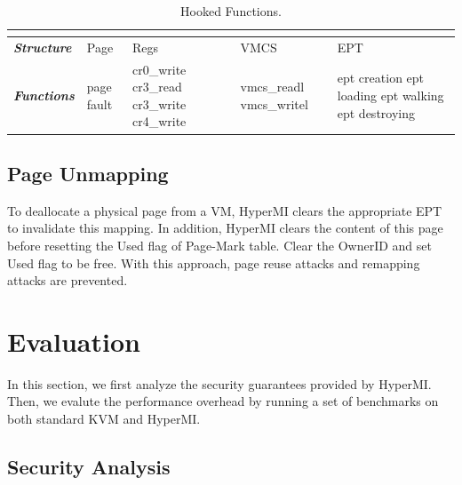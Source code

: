 \documentclass[conference]{IEEEtran}
\begin{document}
\begin{table}
\centering
\caption{Hooked Functions.}\label{tabhook}
\begin{tabular}{p{1cm}|p{1.2cm}|p{1.1cm}|p{1.4cm}|p{1.6cm}}
\hline
\multicolumn{5}{c}{\bfseries\textbf\centering{Hooked Functions}}\\
\hline
{\itshape\bfseries Structure} & Page & Regs & VMCS & EPT \\
\hline
{\itshape\bfseries Functions} &page fault & cr0\_write cr3\_read cr3\_write cr4\_write & vmcs\_readl vmcs\_writel & ept creation ept loading ept walking ept destroying \\
\hline
\end{tabular}
\end{table}

\subsection {Page Unmapping}

To deallocate a physical page from a VM, HyperMI clears the appropriate EPT to invalidate this mapping. In addition, HyperMI clears the content of this page before resetting the Used flag of Page-Mark table. Clear the OwnerID and set Used flag to be free. With this approach, page reuse attacks and remapping attacks are prevented.
\fi


\section{Evaluation}\label{sec:evaluation}
In this section, we first analyze the security guarantees provided by HyperMI. Then, we evalute the performance overhead by running a set of benchmarks on both standard KVM and HyperMI.



\subsection{Security Analysis}




\end{document}
